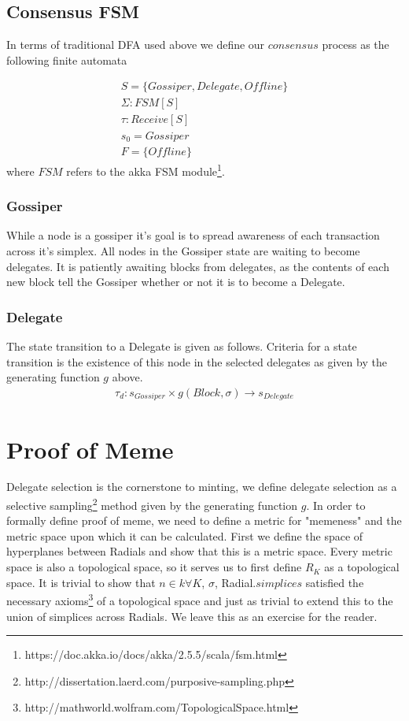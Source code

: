 \documentclass{article}
\begin{document}
\subsection{Consensus FSM}
In terms of traditional DFA used above we define our $consensus$ process as the following finite automata

\begin{equation} \label{eq1}
\begin{split}
S = \{Gossiper, Delegate, Offline\} \\
\Sigma: FSM[S] \\
\tau: Receive[S] \\
s_0 = Gossiper \\
F = \{Offline\}
\end{split}
\end{equation}
where $FSM$ refers to the akka FSM module\footnote{https://doc.akka.io/docs/akka/2.5.5/scala/fsm.html}.
\subsubsection{Gossiper}
While a node is a gossiper it's goal is to spread awareness of each transaction across it's simplex. All nodes in the Gossiper state are waiting to become delegates. It is patiently awaiting blocks from delegates, as the contents of each new block tell the Gossiper whether or not it is to become a Delegate.
\subsubsection{Delegate}
The state transition to a Delegate is given as follows. Criteria for a state transition is the existence of this node in the selected delegates as given by the generating function $g$ above.
\begin{equation} \label{eq1}
\begin{split}
\tau_d: s_{Gossiper} \times g(Block, \sigma) \rightarrow s_{Delegate}
\end{split}
\end{equation}

\section{Proof of Meme}
Delegate selection is the cornerstone to minting, we define delegate selection as a selective sampling\footnote{http://dissertation.laerd.com/purposive-sampling.php} method given by the generating function $g$. In order to formally define proof of meme, we need to define a metric for "memeness" and the metric space upon which it can be calculated. First we define the space of hyperplanes between Radials and show that this is a metric space. Every metric space is also a topological space, so it serves us to first define $R_K$ as a topological space. It is trivial to show that $n \in k \forall K$, $\sigma$, Radial.$simplices$ satisfied the necessary axioms\footnote{http://mathworld.wolfram.com/TopologicalSpace.html} of a topological space and just as trivial to extend this to the union of simplices across Radials. We leave this as an exercise for the reader. 
\end{document}
